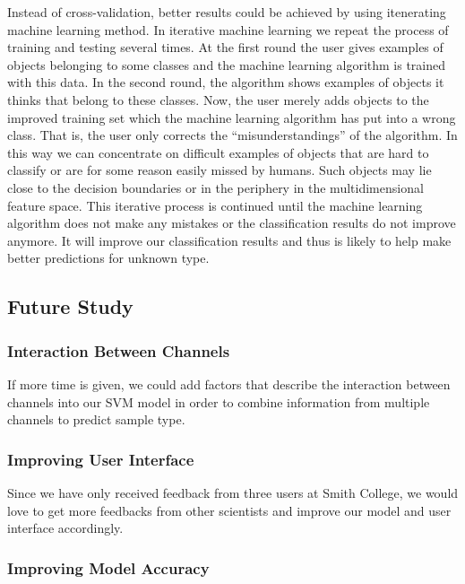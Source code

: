 \documentclass[10pt,letterpaper]{article}
\begin{document}
Instead of cross-validation, better results could be achieved by using
itenerating machine learning method. In iterative machine learning we
repeat the process of training and testing several times. At the first
round the user gives examples of objects belonging to some classes and
the machine learning algorithm is trained with this data. In the second
round, the algorithm shows examples of objects it thinks that belong to
these classes. Now, the user merely adds objects to the improved
training set which the machine learning algorithm has put into a wrong
class. That is, the user only corrects the ``misunderstandings'' of the
algorithm. In this way we can concentrate on difficult examples of
objects that are hard to classify or are for some reason easily missed
by humans. Such objects may lie close to the decision boundaries or in
the periphery in the multidimensional feature space. This iterative
process is continued until the machine learning algorithm does not make
any mistakes or the classification results do not improve anymore. It
will improve our classification results and thus is likely to help make
better predictions for unknown type.

\subsection{Future Study}\label{future-study}

\subsubsection{Interaction Between
Channels}\label{interaction-between-channels-1}

If more time is given, we could add factors that describe the
interaction between channels into our SVM model in order to combine
information from multiple channels to predict sample type.

\subsubsection{Improving User Interface}\label{improving-user-interface}

Since we have only received feedback from three users at Smith College,
we would love to get more feedbacks from other scientists and improve
our model and user interface accordingly.

\subsubsection{Improving Model Accuracy}\label{improving-model-accuracy}
\end{document}
